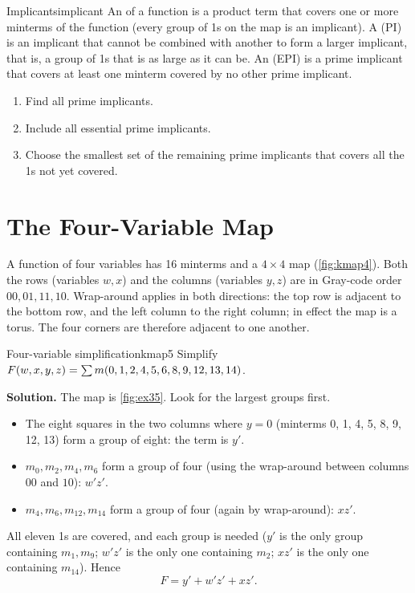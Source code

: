\begin{definition}{Implicants}{implicant}
An  of a function is a product term that covers one or more minterms of the function (every group of 1s on the map is an implicant). A  (PI) is an implicant that cannot be combined with another to form a larger implicant, that is, a group of 1s that is as large as it can be. An  (EPI) is a prime implicant that covers at least one minterm covered by no other prime implicant.
\end{definition}

\begin{keypoint}
\begin{enumerate}
  \item Find all prime implicants.
  \item Include all essential prime implicants.
  \item Choose the smallest set of the remaining prime implicants that covers all the 1s not yet covered.
\end{enumerate}
\end{keypoint}

\section{The Four-Variable Map}
A function of four variables has 16 minterms and a $4\times4$ map (\cref{fig:kmap4}). Both the rows (variables $w,x$) and the columns (variables $y,z$) are in Gray-code order $00,01,11,10$. Wrap-around applies in both directions: the top row is adjacent to the bottom row, and the left column to the right column; in effect the map is a torus. The four corners are therefore adjacent to one another.


\begin{example}{Four-variable simplification}{kmap5}
Simplify $F(w,x,y,z)=\sum m(0,1,2,4,5,6,8,9,12,13,14)$.

\textbf{Solution.} The map is \cref{fig:ex35}. Look for the largest groups first.
\begin{itemize}
  \item The eight squares in the two columns where $y=0$ (minterms 0, 1, 4, 5, 8, 9, 12, 13) form a group of eight: the term is $y'$.
  \item $m_0,m_2,m_4,m_6$ form a group of four (using the wrap-around between columns $00$ and $10$): $w'z'$.
  \item $m_4,m_6,m_{12},m_{14}$ form a group of four (again by wrap-around): $xz'$.
\end{itemize}
All eleven 1s are covered, and each group is needed ($y'$ is the only group containing $m_1,m_9$; $w'z'$ is the only one containing $m_2$; $xz'$ is the only one containing $m_{14}$). Hence
\[ F = y' + w'z' + xz'. \]
\end{example}

